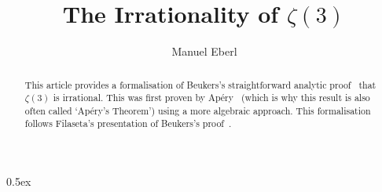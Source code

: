 \documentclass[11pt,a4paper]{article}
\begin{document}
\title{The Irrationality of $\zeta(3)$}
\author{Manuel Eberl}
\maketitle

\begin{abstract}
This article provides a formalisation of Beukers's straightforward analytic proof~\cite{beukers} that $\zeta(3)$ is irrational.
This was first proven by Ap\'{e}ry~\cite{apery} (which is why this result is also often called `Ap\'{e}ry's Theorem') using a more algebraic approach. This formalisation follows Filaseta's presentation of Beukers's proof~\cite{filaseta}.
\end{abstract}

\tableofcontents
\newpage
\parindent 0pt\parskip 0.5ex





\end{document}
